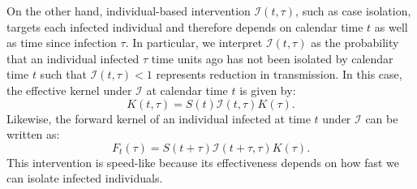 \documentclass[12pt]{article}
\newcommand{\II}{{\mathcal I}}
\begin{document}
On the other hand, individual-based intervention $\II(t, \tau)$, such as case isolation, targets each infected individual and therefore depends on calendar time $t$ as well as time since infection $\tau$.
In particular, we interpret $\II(t,\tau)$ as the probability that an individual infected $\tau$ time units ago has not been isolated by calendar time $t$ such that $\II(t, \tau) < 1$ represents reduction in transmission.
In this case, the effective kernel under $\II$ at calendar time $t$ is given by:
\begin{equation}
K(t, \tau) = S(t) \II(t, \tau) K(\tau).
\end{equation}
Likewise, the forward kernel of an individual infected at time $t$ under $\II$ can be written as:
\begin{equation}
F_t(\tau) = S(t+\tau) \II(t+\tau, \tau) K(\tau).
\end{equation}
This intervention is speed-like because its effectiveness depends on how fast we can isolate infected individuals.
\end{document}
